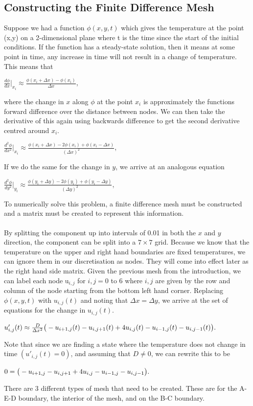 \documentclass[12pt,a4paper]{article}
\begin{document}
\subsection{Constructing the Finite Difference Mesh}
Suppose we had a function $\phi(x,y,t)$ which gives the temperature at the point (x,y) on a 2-dimensional plane where t is the time since the start of the initial conditions. If the function has a steady-state solution, then it means at some point in time, any increase in time will not result in a change of temperature. This means that 
\begin{center}
$\frac{d\phi}{dx}|_{x_i}\approx\frac{\phi(x_i+\Delta x)-\phi(x_i)}{\Delta x}$,
\end{center}
where the change in $x$ along $\phi$ at the point $x_i$ is approximately the functions forward difference over the distance between nodes. We can then take the derivative of this again using backwards difference to get the second derivative centred around $x_i$.
\begin{center}
$\frac{d^2\phi}{dx^2}|_{x_i}\approx\frac{\phi(x_i+\Delta x)-2\phi(x_i)+\phi(x_i-\Delta x)}{(\Delta x)^2}$,
\end{center}
If we do the same for the change in $y$, we arrive at an analogous equation
\begin{center}
$\frac{d^2\phi}{dy^2}|_{y_i}\approx\frac{\phi(y_i+\Delta y)-2\phi(y_i)+\phi(y_i-\Delta y)}{(\Delta y)^2}$,
\end{center}
To numerically solve this problem, a finite difference mesh must be constructed and a matrix must be created to represent this information.
\\\\
By splitting the component up into intervals of 0.01 in both the $x$ and $y$ direction, the component can be split into a $7 \times 7$ grid. Because we know that the temperature on the upper and right hand boundaries are fixed temperatures, we can ignore them in our discretisation as nodes. They will come into effect later as the right hand side matrix. Given the previous mesh from the introduction, we can label each node u$_{i,j}$ for $i,j = 0$ to 6 where $i, j$ are given by the row and column of the node starting from the bottom left hand corner. Replacing $\phi(x,y,t)$ with $u_{i,j}(t)$ and noting that $\Delta x = \Delta y$, we arrive at the set of equations for the change in $u_{i,j}(t)$.
\begin{center}
$u'_{i,j}(t)\approx\frac{D}{\Delta x^2}\big{(}-u_{i+1,j}(t)-u_{i,j+1}(t)+4u_{i,j}(t)-u_{i-1,j}(t)-u_{i,j-1}(t)\big{)}.$
\end{center}
Note that since we are finding a state where the temperature does not change in time $(u'_{i,j}(t)=0)$, and assuming that $D\neq0$, we can rewrite this to be
\begin{center}
  $0=\big{(}-u_{i+1,j}-u_{i,j+1}+4u_{i,j}-u_{i-1,j}-u_{i,j-1}\big{)}.$
\end{center}
There are 3 different types of mesh that need to be created. These are for the A-E-D boundary, the interior of the mesh, and on the B-C boundary.
\end{document}
